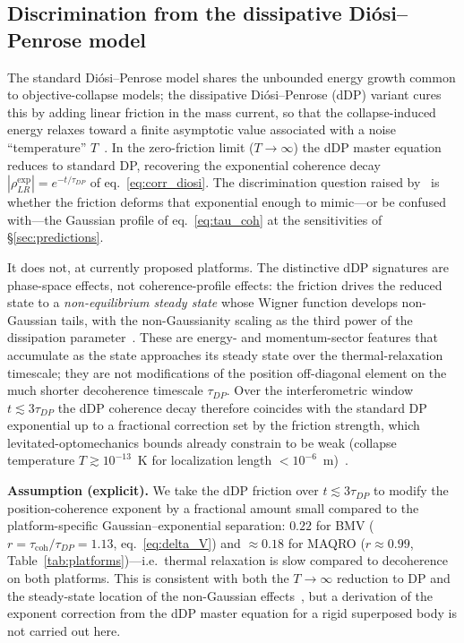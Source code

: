 \documentclass[12pt,a4paper]{article}
\theoremstyle{remark}
\begin{document}
\subsection{Discrimination from the dissipative Di\'osi--Penrose model}
\label{sec:ddp}

The standard Di\'osi--Penrose model shares the unbounded energy growth common to
objective-collapse models; the dissipative Di\'osi--Penrose (dDP) variant cures this by
adding linear friction in the mass current, so that the collapse-induced energy relaxes
toward a finite asymptotic value associated with a noise ``temperature''
$T$~\cite{ddp_model}. In the zero-friction limit ($T\to\infty$) the dDP master equation
reduces to standard DP, recovering the exponential coherence decay
$|\rho_{LR}^{\text{exp}}| = e^{-t/\tau_{DP}}$ of eq.~\eqref{eq:corr_diosi}. The
discrimination question raised by~\cite{melo_dissipative} is whether the friction deforms
that exponential enough to mimic---or be confused with---the Gaussian profile of
eq.~\eqref{eq:tau_coh} at the sensitivities of \S\ref{sec:predictions}.

It does not, at currently proposed platforms. The distinctive dDP signatures are
phase-space effects, not coherence-profile effects: the friction drives the reduced state
to a \emph{non-equilibrium steady state} whose Wigner function develops non-Gaussian tails,
with the non-Gaussianity scaling as the third power of the dissipation
parameter~\cite{melo_dissipative}. These are energy- and momentum-sector features that
accumulate as the state approaches its steady state over the thermal-relaxation timescale;
they are not modifications of the position off-diagonal element on the much shorter
decoherence timescale $\tau_{DP}$. Over the interferometric window $t \lesssim 3\tau_{DP}$
the dDP coherence decay therefore coincides with the standard DP exponential up to a
fractional correction set by the friction strength, which levitated-optomechanics bounds
already constrain to be weak (collapse temperature $T \gtrsim 10^{-13}$~K for localization
length $< 10^{-6}$~m)~\cite{ddp_bounds}.

\textbf{Assumption (explicit).} We take the dDP friction over $t \lesssim 3\tau_{DP}$ to
modify the position-coherence exponent by a fractional amount small compared to the
platform-specific Gaussian--exponential separation: $0.22$ for BMV ($r = \tau_{\text{coh}}/\tau_{DP} = 1.13$,
eq.~\eqref{eq:delta_V}) and $\approx 0.18$ for MAQRO ($r \approx 0.99$,
Table~\ref{tab:platforms})---i.e.\ thermal relaxation is slow compared to decoherence on
both platforms. This is consistent with both
the $T\to\infty$ reduction to DP and the steady-state location of the non-Gaussian
effects~\cite{melo_dissipative}, but a derivation of the exponent correction from the dDP
master equation for a rigid superposed body is not carried out here.
\end{document}
